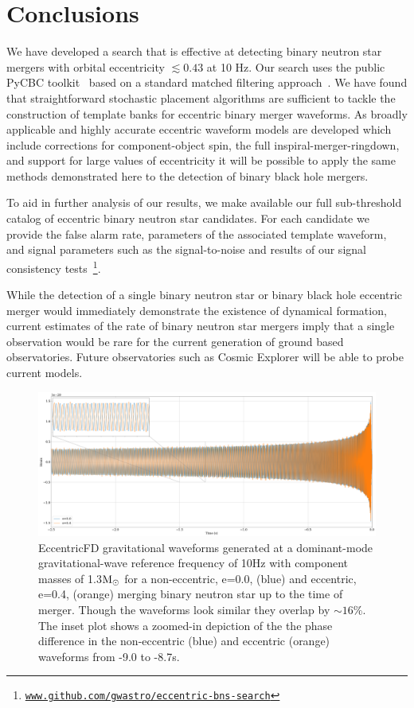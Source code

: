 \section{Conclusions}

We have developed a search that is effective at detecting binary neutron star mergers with orbital eccentricity $\lesssim0.43$ at 10 Hz. Our search uses the public PyCBC toolkit~\cite{pycbc-github} based on a standard matched filtering approach~\cite{Nitz:2018imz,Usman:2015kfa}. We have found that straightforward stochastic placement algorithms are sufficient to tackle the construction of template banks for eccentric binary merger waveforms. As broadly applicable and highly accurate eccentric waveform models are developed which include corrections for component-object spin, the full inspiral-merger-ringdown, and support for large values of eccentricity it will be possible to apply the same methods demonstrated here to the detection of binary black hole mergers.

To aid in further analysis of our results, we make available our full sub-threshold catalog of eccentric binary neutron star candidates. For each candidate we provide the false alarm rate, parameters of the associated template waveform, and signal parameters such as the signal-to-noise and results of our signal consistency tests~\cite{1-ECCBNS}\footnote{\texttt{\url{www.github.com/gwastro/eccentric-bns-search}}}.

While the detection of a single binary neutron star or binary black hole eccentric merger would immediately demonstrate the existence of dynamical formation, current estimates of the rate of binary neutron star mergers imply that a single observation would be rare for the current generation of ground based observatories. Future observatories such as Cosmic Explorer will be able to probe current models.

\label{sec:disc}

\begin{figure}[p]
  \centering
  \includegraphics[width=\textwidth]{Figures/eccentric-search/tf2e_waveforms.png}
\caption{EccentricFD gravitational waveforms generated at a dominant-mode gravitational-wave reference frequency of 10Hz with component masses of 1.3$\mathrm{M}_{\odot}$ for a non-eccentric, e=0.0, (blue) and eccentric, e=0.4, (orange) merging binary neutron star up to the time of merger. Though the waveforms look similar they overlap by $\sim 16\%$. The inset plot shows a zoomed-in depiction of the the phase difference in the non-eccentric (blue) and eccentric (orange) waveforms from -9.0 to -8.7s.}
\label{fig:waveform}
\end{figure}

